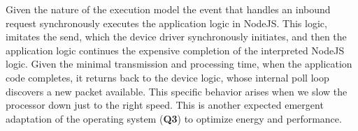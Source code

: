 Given the nature of the execution model the event that handles an inbound request synchronously executes the application logic in NodeJS.  
This logic, imitates the send, which the device driver synchronously initiates, and then the application logic continues the expensive completion of the interpreted NodeJS logic.
Given the minimal transmission and processing time, when the application code completes, it returns back to the device logic, whose internal poll loop discovers a new packet available.  
This specific behavior arises when we slow the processor down just to the right speed.  
This is another expected emergent adaptation of the operating system ({\bf Q3}) to optimize energy and performance. 






